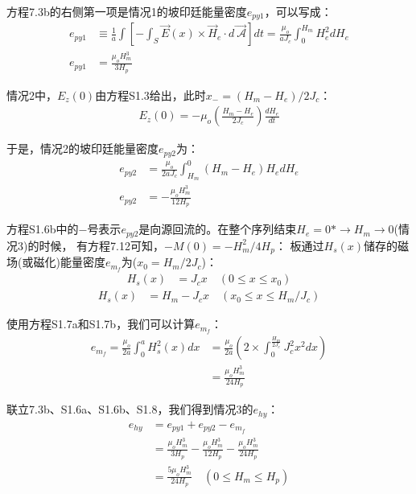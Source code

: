方程7.3b的右侧第一项是情况1的坡印廷能量密度$e_{py1}$，可以写成：
\begin{align*}%
e_{py1}&\equiv\frac{1}{a}\int\left[-\int_{S}\vec{E}(x)\times\vec{H}_e\cdot d\vec{\ \mathcal{A}}\right]dt=\frac{\mu_o}{aJ_c}\int_{0}^{H_m}H_{e}^{2}dH_e\\
e_{py1}&=\frac{\mu_oH_{m}^{3}}{3H_p} \tag{S1.6a}
\end{align*}

情况2中，$E_z(0)$由方程S1.3给出，此时$x_-=(H_m-H_e)/2J_c$：
\begin{align*}%
E_z(0)=-\mu_o\left(\frac{H_m-H_e}{2J_c}\right)\frac{dH_e}{dt} \tag{S1.5b}
\end{align*}

于是，情况2的坡印廷能量密度$e_{py2}$为：
\begin{align*}%
e_{py2}&=\frac{\mu_o}{2aJ_c}\int_{H_m}^{0}(H_m-H_e)H_edH_e\\
e_{py2}&=-\frac{\mu_oH_{m}^{3}}{12H_p} \tag{S1.6b}
\end{align*}

方程S1.6b中的$-$号表示$e_{py2}$是向源回流的。在整个序列结束$H_e=0*\rightarrow H_m\rightarrow 0$(情况3)的时候，
有方程7.12可知，$-M(0)=-H_m^2/4H_p$：
板通过$H_s(x)$储存的磁场(或磁化)能量密度$e_{m_f}$为($x_0=H_m/2J_c$)：
\begin{align*}%
H_s(x)&=J_cx  \quad      (0\leq x\leq x_0) \tag{S1.7a}
\end{align*}
\begin{align*}
H_s(x)&=H_m-J_cx  \quad  (x_0\leq x\leq H_m/J_c) \tag{S1.7b}
\end{align*}

使用方程S1.7a和S1.7b，我们可以计算$e_{m_f}$：
\begin{align*}%
e_{m_f}=\frac{\mu_o}{2a}\int_{0}^{a}H_{s}^{2}(x)dx&=\frac{\mu_o}{2a}\left(2\times\int_{0}^{\frac{H_m}{2J_c}}J_{c}^{2}x^2dx\right)\\
&=\frac{\mu_oH_{m}^{3}}{24H_p} \tag{S1.8}
\end{align*}

联立7.3b、S1.6a、S1.6b、S1.8，我们得到情况3的$e_{hy}$：
\begin{align*}%
e_{hy}&=e_{py1}+e_{py2}-e_{m_f} \\
&=\frac{\mu_oH_{m}^{3}}{3H_p}-\frac{\mu_oH_{m}^{3}}{12H_p}-\frac{\mu_oH_{m}^{3}}{24H_p}\\
&=\frac{5\mu_oH_{m}^{3}}{24H_p}   \quad    (0\leq H_m\leq H_p) \tag{7.15a}
\end{align*}

